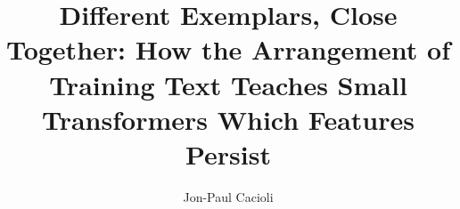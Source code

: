 \documentclass[final]{clv2025}
\begin{document}
\title{Different Exemplars, Close Together: How the Arrangement of Training Text Teaches Small Transformers Which Features Persist}

\author{Jon-Paul Cacioli}


\makeatletter\def\@thefnmark{}\newcommand\nohdpunct{\def\@afterhead{ }}\makeatother
\maketitle


\end{document}
